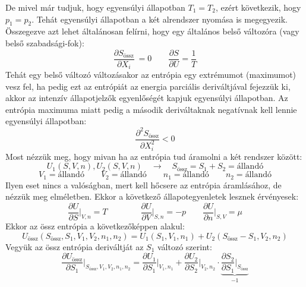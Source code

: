 \documentclass[../main.tex]{subfiles}
\begin{document}
De mivel már tudjuk, hogy egyensúlyi állapotban $T_1 = T_2$, ezért következik, hogy $p_1 = p_2$. Tehát egyensúlyi állapotban a két alrendszer nyomása is megegyezik.
\newline
\newline
Összegezve azt lehet általánosan felírni, hogy egy általános belső változóra (vagy belső szabadsági-fok):
\begin{equation}
    \frac{\partial S_{\text{össz}}}{\partial X_i}\ = 0 \quad \quad \frac{\partial S}{\partial U} = \frac{1}{T}
\end{equation}
Tehát egy belső változó változásakor az entrópia egy extrémumot (maximumot) vesz fel, ha pedig ezt az entrópiát az energia parciális deriváltjával fejezzük ki, akkor az intenzív állapotjelzők egyenlőségét kapjuk egyensúlyi állapotban.
Az entrópia maximuma miatt pedig a második deriváltaknak negatívnak kell lennie egyensúlyi állapotban:
\begin{equation}
    \frac{\partial^2 S_{\text{össz}}}{\partial X_i^2} < 0
\end{equation}
\newline
\newline
Most nézzük meg, hogy mivan ha az entrópia tud áramolni a két rendszer között:
\begin{equation}
    U_1(S, V, n), U_2(S, V, n) \quad \to \quad S_{\text{össz}} = S_1 + S_2 = \text{állandó}
\end{equation}
\begin{equation}
    V_1 = \text{állandó} \qquad V_2 = \text{állandó} \qquad n_1 = \text{állandó} \qquad n_2 = \text{állandó}
\end{equation}
Ilyen eset nincs a valóságban, mert kell hőcsere az entrópia áramlásához, de nézzük meg elméletben. Ekkor a következő állapotegyenletek lesznek érvényesek:
\begin{equation}
    \frac{\partial U}{\partial S}\bigg|_{V,n} = T \qquad \qquad \frac{\partial U}{\partial V}\bigg|_{S,n} = - p \qquad \frac{\partial U}{\partial n}\bigg|_{S,V} = \mu
\end{equation}
Ekkor az össz entrópia a következőképpen alakul:
\begin{equation}
    U_{\text{össz}} (S_{\text{össz}}, S_1, V_1, V_2, n_1, n_2) = U_1(S_1, V_1, n_1) + U_2(S_{\text{össz}} - S_1, V_2, n_2)
\end{equation}
Vegyük az össz entrópia deriváltját az $S_1$ változó szerint:
\begin{equation}
    \frac{\partial U_{\text{össz}}}{\partial S_1}\bigg|_{S_{\text{össz}}, V_1, V_2, n_1, n_2} = \frac{\partial U_1}{\partial S_1}\bigg|_{V_1, n_1} + \frac{\partial U_2}{\partial S_2}\bigg|_{V_2, n_2} \cdot \underbrace{\frac{\partial S_2}{\partial S_1}\bigg|_{S_{\text{össz}}}}_{-1}
\end{equation}
\end{document}
